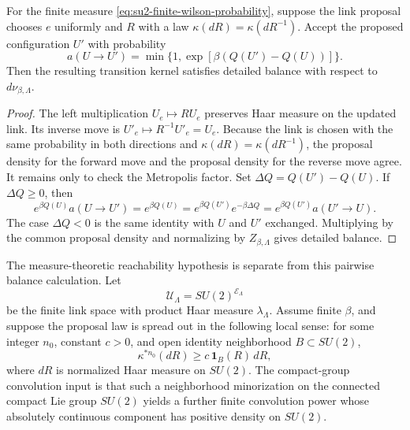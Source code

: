 \begin{lemma}
\label{lem:su2-link-metropolis-detailed-balance}
For the finite measure \eqref{eq:su2-finite-wilson-probability}, suppose the
link proposal chooses \(e\) uniformly and \(R\) with a law
\(\kappa(dR)=\kappa(dR^{-1})\).  Accept the proposed configuration \(U'\) with
probability
\begin{equation}
  a(U\to U')
  =
  \min\{1,\exp[\beta(Q(U')-Q(U))]\}.
  \label{eq:su2-link-metropolis-acceptance}
\end{equation}
Then the resulting transition kernel satisfies detailed balance with respect
to \(d\nu_{\beta,\Lambda}\).
\end{lemma}

\begin{proof}
The left multiplication \(U_e\mapsto R U_e\) preserves Haar measure on the
updated link.  Its inverse move is \(U'_e\mapsto R^{-1}U'_e=U_e\).  Because
the link is chosen with the same probability in both directions and
\(\kappa(dR)=\kappa(dR^{-1})\), the proposal density for the forward move and
the proposal density for the reverse move agree.  It remains only to check
the Metropolis factor.  Set \(\Delta Q=Q(U')-Q(U)\).  If \(\Delta Q\geq0\),
then
\[
  e^{\beta Q(U)} a(U\to U')
  =
  e^{\beta Q(U)}
  =
  e^{\beta Q(U')}e^{-\beta\Delta Q}
  =
  e^{\beta Q(U')} a(U'\to U).
\]
The case \(\Delta Q<0\) is the same identity with \(U\) and \(U'\) exchanged.
Multiplying by the common proposal density and normalizing by
\(Z_{\beta,\Lambda}\) gives detailed balance.
\end{proof}

The measure-theoretic reachability hypothesis is separate from this pairwise
balance calculation.  Let
\[
  \mathcal U_\Lambda=SU(2)^{\mathcal E_\Lambda}
\]
be the finite link space with product Haar measure \(\lambda_\Lambda\).
Assume finite \(\beta\), and suppose the proposal law is spread out in the
following local sense: for some integer \(n_0\), constant \(c>0\), and open
identity neighborhood \(B\subset SU(2)\),
\begin{equation}
  \kappa^{*n_0}(dR)\ge c\,\mathbf 1_B(R)\,dR ,
  \label{eq:su2-spread-out-proposal-minorization}
\end{equation}
where \(dR\) is normalized Haar measure on \(SU(2)\).  The compact-group
convolution input is that such a neighborhood minorization on the connected
compact Lie group \(SU(2)\) yields a further finite convolution power whose
absolutely continuous component has positive density on \(SU(2)\).


